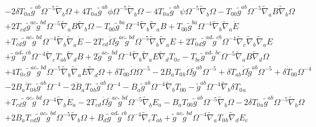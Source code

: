 \documentclass[10pt,letterpaper]{article}
\numberwithin{equation}{section}
\begin{document}
\begin{eqnarray}
&& - 2 \delta T_{0}{}_{a} \tilde{g}^{ab} \Omega^{-5} \tilde{\nabla}_{b}\Omega + 4 T_{0}{}_{a} \tilde{g}^{ab} \phi \Omega^{-5} \tilde{\nabla}_{b}\Omega - 4 T_{0}{}_{a} \tilde{g}^{ab} \psi \Omega^{-5} \tilde{\nabla}_{b}\Omega -  T_{00}{} \tilde{g}^{ab} \Omega^{-5} \tilde{\nabla}_{a}B \tilde{\nabla}_{b}\Omega \nonumber \\ 
&& + 2 T_{cd} \tilde{g}^{ac} \tilde{g}^{bd} \Omega^{-5} \tilde{\nabla}_{a}B \tilde{\nabla}_{b}\Omega -  T_{00}{} \tilde{g}^{ba} \Omega^{-4} \tilde{\nabla}_{b}\tilde{\nabla}_{a}B + T_{00}{} \tilde{g}^{ba} \Omega^{-4} \tilde{\nabla}_{b}\tilde{\nabla}_{a}\dot{E} \nonumber \\ 
&& + T_{cd} \tilde{g}^{ac} \tilde{g}^{bd} \Omega^{-4} \tilde{\nabla}_{b}\tilde{\nabla}_{a}\dot{E} - 2 T_{cd} \dot{\Omega} \tilde{g}^{ac} \tilde{g}^{bd} \Omega^{-5} \tilde{\nabla}_{b}\tilde{\nabla}_{a}E + 2 T_{0}{}_{d} \tilde{g}^{ad} \tilde{g}^{cb} \Omega^{-4} \tilde{\nabla}_{c}\tilde{\nabla}_{b}\tilde{\nabla}_{a}E \nonumber \\ 
&& + \tilde{g}^{ad} \tilde{g}^{cb} \Omega^{-4} \tilde{\nabla}_{c}T_{ab} \tilde{\nabla}_{d}B + 2 \tilde{g}^{ac} \tilde{g}^{bd} \Omega^{-4} \tilde{\nabla}_{b}\tilde{\nabla}_{a}E \tilde{\nabla}_{d}T_{0}{}_{c} -  T_{bc} \tilde{g}^{ad} \tilde{g}^{bc} \Omega^{-5} \tilde{\nabla}_{a}B \tilde{\nabla}_{d}\Omega \nonumber \\ 
&& + 4 T_{0}{}_{c} \tilde{g}^{ac} \tilde{g}^{bd} \Omega^{-5} \tilde{\nabla}_{b}\tilde{\nabla}_{a}E \tilde{\nabla}_{d}\Omega +\delta T_{00}{} \dot{\Omega} \Omega^{-5} - 2 B_{a} T_{0}{}_{b} \dot{\Omega} \tilde{g}^{ab} \Omega^{-5} + \delta T_{ab} \dot{\Omega} \tilde{g}^{ab} \Omega^{-5} + \delta \dot{T}_{00}{} \Omega^{-4} \nonumber \\ 
&& - 2 B_{a} \dot{T}_{0}{}_{b} \tilde{g}^{ab} \Omega^{-4} - 2 \dot{B}_{a} T_{0}{}_{b} \tilde{g}^{ab} \Omega^{-4} -  B_{a} \tilde{g}^{ab} \Omega^{-4} \tilde{\nabla}_{b}T_{00}{} -  \tilde{g}^{ab} \Omega^{-4} \tilde{\nabla}_{b}\delta T_{0}{}_{a} \nonumber \\ 
&& + T_{cd} \tilde{g}^{ac} \tilde{g}^{bd} \Omega^{-4} \tilde{\nabla}_{b}\dot{E}_{a} - 2 T_{cd} \dot{\Omega} \tilde{g}^{ac} \tilde{g}^{bd} \Omega^{-5} \tilde{\nabla}_{b}E_{a} -  B_{a} T_{00}{} \tilde{g}^{ab} \Omega^{-5} \tilde{\nabla}_{b}\Omega - 2 \delta T_{0}{}_{a} \tilde{g}^{ab} \Omega^{-5} \tilde{\nabla}_{b}\Omega \nonumber \\ 
&& + 2 B_{a} T_{cd} \tilde{g}^{ac} \tilde{g}^{bd} \Omega^{-5} \tilde{\nabla}_{b}\Omega + B_{d} \tilde{g}^{ad} \tilde{g}^{cb} \Omega^{-4} \tilde{\nabla}_{c}T_{ab} + \tilde{g}^{ac} \tilde{g}^{bd} \Omega^{-4} \tilde{\nabla}_{a}T_{0}{}_{b} \tilde{\nabla}_{d}E_{c} \nonumber \\ 

\end{eqnarray}
\end{document}
